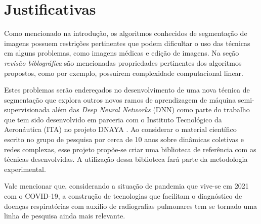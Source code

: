 \chapter{Justificativas}\label{cap:justificativas}

Como mencionado na introdução, os algoritmos conhecidos de segmentação
de imagens possuem restrições pertinentes que podem dificultar o uso
das técnicas em alguns problemas, como imagens médicas e edição de
imagens. Na seção \textit{revisão biblográfica} são mencionadas propriedades
pertinentes dos algoritmos propostos, como por exemplo, possuirem complexidade
computacional linear.

Estes problemas serão endereçados no desenvolvimento de uma nova
técnica de segmentação que explora outros novos ramos de aprendizagem
de máquina semi-supervisionada além das \textit{Deep Neural Networks}
(\gls{DNN}) como parte do trabalho que tem sido desenvolvido em parceria com
o Instituto Tecnológico da Aeronáutica (\gls{ITA}) no projeto DNAYA
\cite{DnayaMotivation}. Ao considerar o material científico escrito no
grupo de pesquisa por cerca de 10 anos sobre dinâmicas coletivas e
redes complexas, esse projeto propõe-se criar uma biblioteca de
referência com as técnicas desenvolvidas. A utilização dessa
biblioteca fará parte da metodologia experimental.

Vale mencionar que, considerando a situação de pandemia que vive-se em
2021 com o COVID-19, a construção de tecnologias que facilitam o
diagnóstico de doenças respiratórias com auxílio de radiografias
pulmonares tem se tornado uma linha de pesquisa ainda mais relevante.
